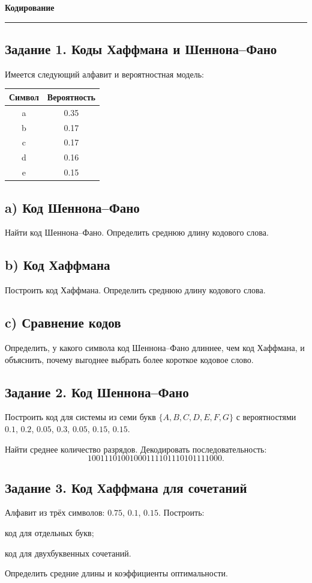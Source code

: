 \documentclass[a4paper,12pt,oneside]{article}
\newcommand{\Task}[1]{%
  \subsection*{#1}%
  \vspace{-0.2\baselineskip}%
}
\begin{document}
\begin{center}
    {\Large\bfseries Кодирование}\\[2mm]
\end{center}
\vspace{2mm}
\hrule
\vspace{4mm}

\Task{Задание 1. Коды Хаффмана и Шеннона--Фано}
Имеется следующий алфавит и вероятностная модель:

\begin{table}[H]
\centering
\begin{tabular}{cc}
\toprule
Символ & Вероятность \\
\midrule
a & 0.35 \\
b & 0.17 \\
c & 0.17 \\
d & 0.16 \\
e & 0.15 \\
\bottomrule
\end{tabular}
\end{table}

\subsection*{a) Код Шеннона--Фано}
Найти код Шеннона--Фано. Определить среднюю длину кодового слова.

\subsection*{b) Код Хаффмана}
Построить код Хаффмана. Определить среднюю длину кодового слова.

\subsection*{c) Сравнение кодов}
Определить, у какого символа код Шеннона--Фано длиннее, чем код Хаффмана, и объяснить, почему выгоднее выбрать более короткое кодовое слово.

\Task{Задание 2. Код Шеннона--Фано}
Построить код для системы из семи букв $\{A,B,C,D,E,F,G\}$ с вероятностями
$0.1$, $0.2$, $0.05$, $0.3$, $0.05$, $0.15$, $0.15$.

Найти среднее количество разрядов. Декодировать последовательность:
\[
10011101001000111101110101111000.
\]

\Task{Задание 3. Код Хаффмана для сочетаний}
Алфавит из трёх символов: $0.75$, $0.1$, $0.15$. Построить:
\begin{alphlist}
    \item код для отдельных букв;
    \item код для двухбуквенных сочетаний.
\end{alphlist}
Определить средние длины и коэффициенты оптимальности.
\end{document}
